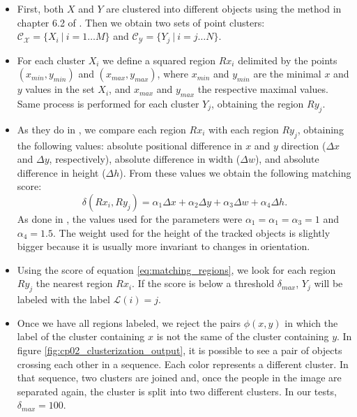 \begin{itemize}
 \item First, both $X$ and $Y$ are clustered into different objects using the method in chapter 6.2 of 
\cite{rusu2009semantic}. Then we obtain two sets of point clusters: $\mathcal{C_X} = \{ X_i ~|~ i=1 \dots M \}$ 
and $\mathcal{C_Y} = \{ Y_j ~|~ i=j \dots N \}$.
 \item For each cluster $X_i$ we define a squared region $Rx_i$ delimited by the points $(x_{min}, y_{min})$ and $(x_{max}, y_{max})$, where $x_{min}$ and $y_{min}$ are the minimal $x$ and $y$ values in the set $X_i$, and $x_{max}$ and $y_{max}$ the respective maximal values. Same process is performed for each cluster $Y_j$, obtaining the region $Ry_j$.
 \item As they do in \cite{siebel2003design}, we compare each region $Rx_i$ with each region $Ry_j$, obtaining the following values: absolute positional difference in $x$ and $y$ direction ($\varDelta x$ and $\varDelta y$, respectively), absolute difference in width ($\varDelta w$), and absolute difference in height ($\varDelta h$). From these values we obtain the following matching score:
 \begin{equation}\label{eq:matching_regions}
  \delta (Rx_i, Ry_j) = \alpha_1 \varDelta x + \alpha_2 \varDelta y + \alpha_3 \varDelta w + \alpha_4 \varDelta h.
 \end{equation}
 As done in \cite{siebel2003design}, the values used for the parameters were $\alpha_1 = \alpha_1 = \alpha_3 = 1$ and $\alpha_4 = 1.5$. The weight used for the height of the tracked objects is slightly bigger because it is usually more invariant to changes in orientation.
 \item Using the score of equation \ref{eq:matching_regions}, we look for each region $Ry_j$ the nearest region $Rx_i$. 
If the score is below a threshold $\delta_{max}$, $Y_j$ will be labeled with the label $\mathcal{L}(i) = j$.
 \item Once we have all regions labeled, we reject the pairs $\phi(x,y)$ in which the label of the cluster containing 
$x$ is not the same of the cluster containing $y$. In figure \ref{fig:cp02_clusterization_output}, it is possible to see a 
pair of objects crossing each other in a sequence. Each color represents a different cluster. In that sequence, two 
clusters are joined and, once the people in the image are separated again, the cluster is split into two 
different clusters. In our tests, $\delta_{max} = 100$.
\end{itemize}

